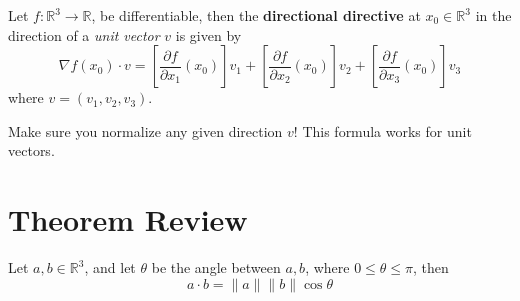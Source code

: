 \documentclass[openany]{book}
\newcommand{\R}{\mathbb{R}}
\begin{document}
\begin{defn}
    Let $f:\R^3\to\R$, be differentiable, then the \textbf{directional directive} at $x_0\in\R^3$ in the direction of a \textit{unit vector} $v$ is given by 
    \begin{equation*}
        \nabla f(x_0)\cdot v=\left[\frac{\partial f}{\partial x_1}(x_0)\right]v_1+\left[\frac{\partial f}{\partial x_2}(x_0)\right]v_2+\left[\frac{\partial f}{\partial x_3}(x_0)\right]v_3
    \end{equation*}
    where $v=(v_1,v_2,v_3)$.
\end{defn}
\begin{warn}
    Make sure you normalize any given direction $v$! This formula works for unit vectors.
\end{warn}

































\newpage

\chapter{Theorem Review}
\begin{prop}\label{dot}
    Let $a,b\in\R^3$, and let $\theta$ be the angle between $a,b$, where $0\leq\theta\leq\pi$, then 
    \begin{equation*}
        a\cdot b=\|a\|\|b\|\cos\theta
    \end{equation*}
\end{prop}
\end{document}
